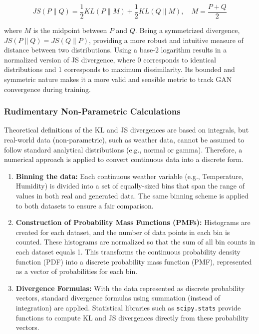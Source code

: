 \documentclass[12pt, draftclsnofoot, onecolumn]{IEEEtran}
\begin{document}
\begin{equation}
JS(P \| Q) = \frac{1}{2} KL(P \| M) + \frac{1}{2} KL(Q \| M), \quad M = \frac{P + Q}{2}
\end{equation}

where $M$ is the midpoint between $P$ and $Q$. Being a symmetrized divergence, $JS(P \| Q) = JS(Q \| P)$, providing a more robust and intuitive measure of distance between two distributions. Using a base-2 logarithm results in a normalized version of JS divergence, where 0 corresponds to identical distributions and 1 corresponds to maximum dissimilarity. Its bounded and symmetric nature makes it a more valid and sensible metric to track GAN convergence during training.

\subsubsection{Rudimentary Non-Parametric Calculations}
Theoretical definitions of the KL and JS divergences are based on integrals, but real-world data (non-parametric), such as weather data, cannot be assumed to follow standard analytical distributions (e.g., normal or gamma). Therefore, a numerical approach is applied to convert continuous data into a discrete form.

\begin{enumerate}
    \item \textbf{Binning the data:} Each continuous weather variable (e.g., Temperature, Humidity) is divided into a set of equally-sized bins that span the range of values in both real and generated data. The same binning scheme is applied to both datasets to ensure a fair comparison.
    
    \item \textbf{Construction of Probability Mass Functions (PMFs):} Histograms are created for each dataset, and the number of data points in each bin is counted. These histograms are normalized so that the sum of all bin counts in each dataset equals 1. This transforms the continuous probability density function (PDF) into a discrete probability mass function (PMF), represented as a vector of probabilities for each bin.
    
    \item \textbf{Divergence Formulas:} With the data represented as discrete probability vectors, standard divergence formulas using summation (instead of integration) are applied. Statistical libraries such as \texttt{scipy.stats} provide functions to compute KL and JS divergences directly from these probability vectors.
\end{enumerate}
\end{document}
